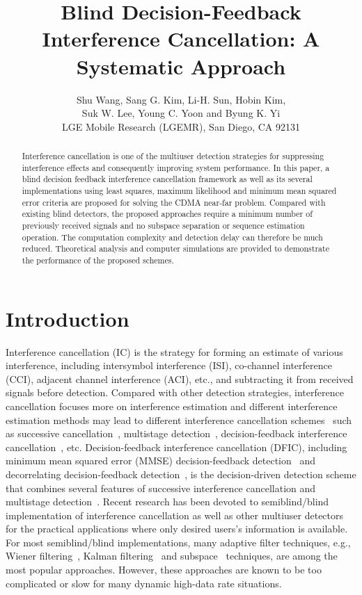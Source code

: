 \documentclass[a4paper,10pt,fleqn, twocolumn]{IEEETran}
\title{Blind Decision-Feedback Interference Cancellation: A Systematic Approach}
\author{Shu Wang, Sang G. Kim, Li-H. Sun, Hobin Kim,\\ Suk W. Lee, Young C. Yoon and Byung K. Yi\\ LGE Mobile Research (LGEMR), San Diego, CA 92131}
\date{}
\begin{document}
\maketitle
\begin{abstract}\small
Interference cancellation is one of the multiuser detection
strategies for suppressing interference effects and consequently
improving system performance. In this paper, a blind decision
feedback interference cancellation framework as well as its
several implementations using least squares, maximum likelihood
and minimum mean squared error criteria are proposed for solving
the CDMA near-far problem. Compared with existing blind detectors,
the proposed approaches require a minimum number of previously
received signals and no subspace separation or sequence estimation
operation. The computation complexity and detection delay can
therefore be much reduced. Theoretical analysis and computer
simulations are provided to demonstrate the performance of the
proposed schemes.
\end{abstract}
\section{Introduction}
Interference cancellation (IC) is the strategy for forming an
estimate of various interference, including intersymbol
interference (ISI), co-channel interference (CCI), adjacent
channel interference (ACI), etc., and subtracting it from received
signals before detection. Compared with other detection
strategies, interference cancellation focuses more on interference
estimation and different interference estimation methods may lead
to different interference cancellation
schemes~\cite{Verd98,Wang02b} such as successive
cancellation~\cite{Kohno91}, multistage detection~\cite{Vara88},
decision-feedback interference cancellation~\cite{Kave85,Duel95},
etc. Decision-feedback interference cancellation (DFIC), including
minimum mean squared error (MMSE) decision-feedback
detection~\cite{Kave85} and decorrelating decision-feedback
detection~\cite{Duel95}, is the decision-driven detection scheme
that combines several features of successive interference
cancellation and multistage detection~\cite{Verd98}. Recent
research has been devoted to semiblind/blind implementation of
interference cancellation as well as other multiuser
detectors~\cite{Madh94,Madh98,Wang98,Zhang02} for the practical
applications where only desired users's information is available.
For most semiblind/blind implementations, many adaptive filter
techniques, e.g., Wiener filtering~\cite{Madh94}, Kalman
filtering~\cite{Zhang02} and subspace~\cite{Wang98} techniques,
are among the most popular approaches. However, these approaches
are known to be too complicated or slow for many dynamic high-data
rate situations.
\end{document}
